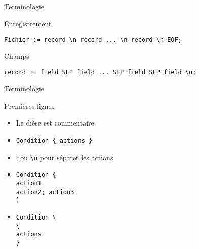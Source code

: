 \def\ftitle{Terminologie}
\begin{frame}[containsverbatim]{\ftitle}
\def\blocktitle{Enregistrement}
\begin{block}{\blocktitle}
\begin{verbatim}
Fichier := record \n record ... \n record \n EOF;
\end{verbatim}
\end{block}
\def\blocktitle{Champs}
\begin{block}{\blocktitle}
\begin{verbatim}
record := field SEP field ... SEP field SEP field \n;
\end{verbatim}
\end{block}
\end{frame}


\def\ftitle{Terminologie}
\begin{frame}[containsverbatim]{\ftitle}
\def\blocktitle{Premières lignes}
\begin{block}{\blocktitle}
\begin{itemize}
\item Le dièse est commentaire
\item \verb!Condition { actions }!
\item ; ou \verb!\n! pour séparer les actions
\item \begin{verbatim}Condition {
action1
action2; action3
}
\end{verbatim}
\item \begin{verbatim}Condition \
{
actions
}
\end{verbatim}

\end{itemize}
\end{block}
\end{frame}


